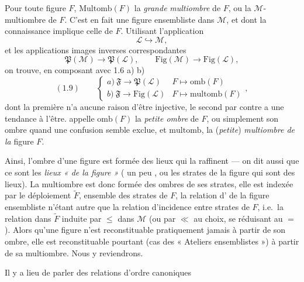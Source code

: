 \documentclass[11pt,a4paper]{article}
\begin{document}
Pour toute figure $F$, $\mathrm{Multomb}(F)$   la \emph{grande} \emph{multiombre} de $F$, ou la $\mathcal{M}$-multiombre de $F$.  C'est en fait une figure ensembliste dans $\mathcal{M}$,  et dont la connaissance implique celle de $F$.  Utilisant   l'application
\[
  \mathcal{L} \hookrightarrow \mathcal{M} ,
\]
et les applications images inverses correspondantes
\[
  \mathfrak{P}(\mathcal{M}) \to \mathfrak{P}(\mathcal{L}) , \qquad \mathrm{Fig}(\mathcal{M}) \to \mathrm{Fig}(\mathcal{L}) ,
\]
on trouve, en composant avec 1.6 a) b)
\[
  (1.9) \qquad
  \begin{cases}
    a)\ \mathfrak{F} \to \mathfrak{P}(\mathcal{L}) & F \mapsto \mathrm{omb}(F) \\
    b)\ \mathfrak{F} \to \mathrm{Fig}(\mathcal{L}) & F \mapsto \mathrm{multomb}(F)
  \end{cases} ,
\]
dont la première n'a aucune raison d'être injective, le second par contre a une tendance à l'être.   appelle $\mathrm{omb}(F)$ la \emph{petite ombre} de $F$, ou simplement son ombre quand une confusion semble exclue, et   $\mathrm{multomb}$, la (\emph{petite}) \emph{multiombre de la} figure $F$.

Ainsi, l'ombre d'une figure est formée des lieux qui la raffinent — on dit aussi que ce sont les \emph{lieux « de la figure »} (\ill{} un peu , ou les strates de la figure qui sont des lieux). La multiombre est donc formée des ombres de ses strates, elle est indexée par le déploiement $\widetilde{F}$, ensemble des strates de $F$, la relation d'\struck{\ill{}} de la figure ensembliste n'étant autre que la relation d'incidence entre strates de $F$, i.e.\ la relation dans $\widetilde{F}$ induite par $\leq$ dans $\mathcal{M}$ (ou par $\ll$ au choix, se réduisant au $=$). Alors qu'une figure n'est reconstituable pratiquement jamais à partir de son ombre, elle est reconstituable pourtant   (cas des « Ateliers ensemblistes »)  à partir de sa multiombre. Nous y reviendrons.

 Il y a lieu de parler des relations d'ordre canoniques
\end{document}
